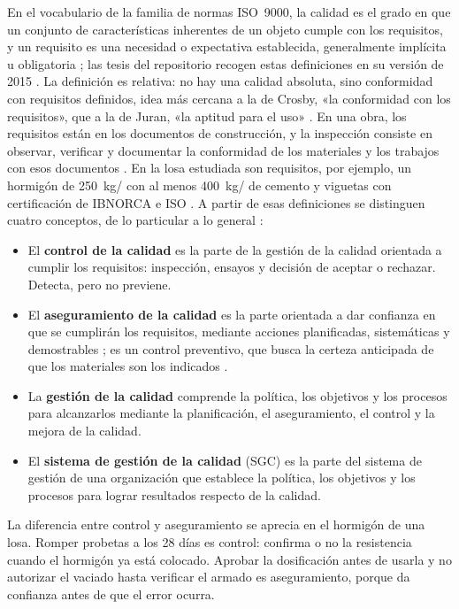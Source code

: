 En el vocabulario de la familia de normas ISO~9000, la calidad es el grado en que un conjunto de características inherentes de un objeto cumple con los requisitos, y un requisito es una necesidad o expectativa establecida, generalmente implícita u obligatoria \parencite{iso9000_2026}; las tesis del repositorio recogen estas definiciones en su versión de 2015 \parencite[pp.~21--22]{mamanicalsina2025}. La definición es relativa: no hay una calidad absoluta, sino conformidad con requisitos definidos, idea más cercana a la de Crosby, «la conformidad con los requisitos», que a la de Juran, «la aptitud para el uso» \parencite[pp.~24, 31]{cepeda2017}. En una obra, los requisitos están en los documentos de construcción, y la inspección consiste en observar, verificar y documentar la conformidad de los materiales y los trabajos con esos documentos \parencite[sección~2.3, pp.~39, 43]{aci318_2025}. En la losa estudiada son requisitos, por ejemplo, un hormigón de 250~kg/\cmdos{} con al menos 400~kg/\mtres{} de cemento y viguetas con certificación de IBNORCA e ISO \parencite[p.~3]{uatf_et}. A partir de esas definiciones se distinguen cuatro conceptos, de lo particular a lo general \parencite{iso9000_2026}:
\begin{itemize}
  \item El \textbf{control de la calidad} es la parte de la gestión de la calidad orientada a cumplir los requisitos: inspección, ensayos y decisión de aceptar o rechazar. Detecta, pero no previene.
  \item El \textbf{aseguramiento de la calidad} es la parte orientada a dar confianza en que se cumplirán los requisitos, mediante acciones planificadas, sistemáticas y demostrables \parencite[p.~21]{alfaro2011}; es un control preventivo, que busca la certeza anticipada de que los materiales son los indicados \parencite[p.~60]{cajias2023}.
  \item La \textbf{gestión de la calidad} comprende la política, los objetivos y los procesos para alcanzarlos mediante la planificación, el aseguramiento, el control y la mejora de la calidad.
  \item El \textbf{sistema de gestión de la calidad} (SGC) es la parte del sistema de gestión de una organización que establece la política, los objetivos y los procesos para lograr resultados respecto de la calidad.
\end{itemize}
La diferencia entre control y aseguramiento se aprecia en el hormigón de una losa. Romper probetas a los 28 días es control: confirma o no la resistencia cuando el hormigón ya está colocado. Aprobar la dosificación antes de usarla y no autorizar el vaciado hasta verificar el armado es aseguramiento, porque da confianza antes de que el error ocurra.

